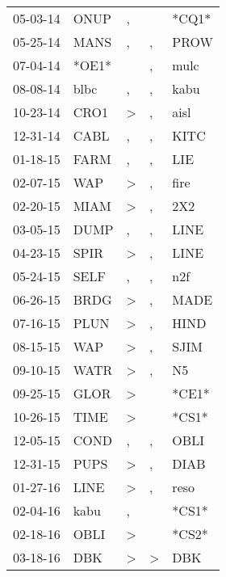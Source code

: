 \begin{supertabular}{lllll}
 05-03-14 &   ONUP &                , &               &  *CQ1* \\
 05-25-14 &   MANS &                , &             , &   PROW \\
 07-04-14 &  *OE1* &                  &             , &   mulc \\
 08-08-14 &   blbc &                , &             , &   kabu \\
 10-23-14 &   CRO1 &     \textgreater &             , &   aisl \\
 12-31-14 &   CABL &                , &             , &   KITC \\
 01-18-15 &   FARM &                , &             , &    LIE \\
 02-07-15 &    WAP &     \textgreater &             , &   fire \\
 02-20-15 &   MIAM &     \textgreater &             , &    2X2 \\
 03-05-15 &   DUMP &                , &             , &   LINE \\
 04-23-15 &   SPIR &     \textgreater &             , &   LINE \\
 05-24-15 &   SELF &                , &             , &    n2f \\
 06-26-15 &   BRDG &     \textgreater &             , &   MADE \\
 07-16-15 &   PLUN &     \textgreater &             , &   HIND \\
 08-15-15 &    WAP &     \textgreater &             , &   SJIM \\
 09-10-15 &   WATR &     \textgreater &             , &     N5 \\
 09-25-15 &   GLOR &     \textgreater &               &  *CE1* \\
 10-26-15 &   TIME &     \textgreater &               &  *CS1* \\
 12-05-15 &   COND &                , &             , &   OBLI \\
 12-31-15 &   PUPS &     \textgreater &             , &   DIAB \\
 01-27-16 &   LINE &     \textgreater &             , &   reso \\
 02-04-16 &   kabu &                , &               &  *CS1* \\
 02-18-16 &   OBLI &     \textgreater &               &  *CS2* \\
 03-18-16 &    DBK &     \textgreater &  \textgreater &    DBK \\

\end{supertabular}
